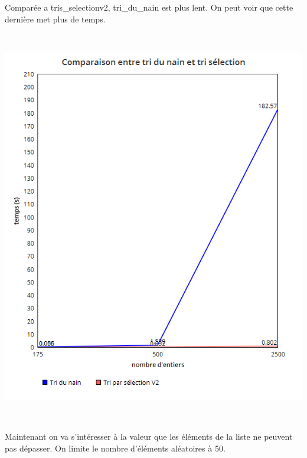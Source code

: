 \documentclass[a4paper, 12pt]{article}
\begin{document}
Comparée a tris\_selectionv2, tri\_du\_nain est plus lent. On peut voir que cette dernière met plus de temps.

~

\begin{center}
\includegraphics[scale=0.25]{trinainvstrisel.png}
\end{center}
~

Maintenant on va s'intéresser à la valeur que les éléments de la liste ne peuvent pas dépasser. On limite le nombre d'éléments aléatoires à 50.

~
\end{document}
